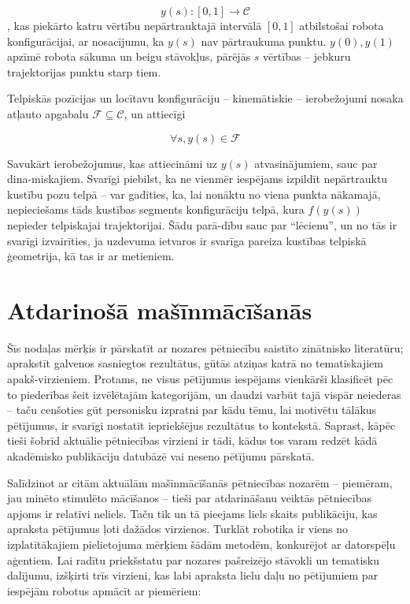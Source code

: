 \documentclass[12pt, a4paper]{article}
\numberwithin{equation}{section} %
\begin{document}
\begin{equation}
    y(s): [0,1] \rightarrow \mathcal{C}
\end{equation}
, kas piekārto katru vērtību nepārtrauktajā intervālā $[0,1]$ atbilstošai robota konfigurācijai, ar nosacījumu, ka $y(s)$ nav pārtraukuma punktu. $y(0), y(1)$ apzīmē robota sākuma un beigu stāvokļus, pārējās $s$ vērtības -- jebkuru trajektorijas punktu starp tiem.

Telpiskās pozīcijas un locītavu konfigurāciju -- kinemātiskie -- ierobežojumi nosaka atļauto apgabalu $\mathcal{F} \subseteq \mathcal{C}$, un attiecīgi

\begin{equation}
    \forall s,y(s) \in \mathcal{F}
\end{equation}

Savukārt ierobežojumus, kas attiecināmi uz $y(s)$ atvasinājumiem, sauc par dina-miskajiem. Svarīgi piebilst, ka ne vienmēr iespējams izpildīt nepārtrauktu kustību pozu telpā -- var gadīties, ka, lai nonāktu no viena punkta nākamajā, nepieciešams tāds kustības segments konfigurāciju telpā, kura $f(y(s))$ nepieder telpiskajai trajektorijai. Šādu parā-dību sauc par ``lēcienu'', un no tās ir svarīgi izvairīties, ja uzdevuma ietvaros ir svarīga pareiza kustības telpiskā ģeometrija, kā tas ir ar metieniem.


%
%
%
%
%
%
%
%
%
%
%
%
%
%
%
%
%
%
%

\newpage
\section{Atdarinošā mašīnmācīšanās}

Šīs nodaļas mērķis ir pārskatīt ar nozares pētniecību saistīto zinātnisko literatūru; aprakstīt galvenos sasniegtos rezultātus, gūtās atziņas katrā no tematiskajiem apakš-virzieniem. Protams, ne visus pētījumus iespējams vienkārši klasificēt pēc to piederības šeit izvēlētajām kategorijām, un daudzi varbūt tajā vispār neiederas -- taču cenšoties gūt personisku izpratni par kādu tēmu, lai motivētu tālākus pētījumus, ir svarīgi nostatīt iepriekšējus rezultātus to kontekstā. Saprast, kāpēc tieši šobrīd aktuālie pētniecības virzieni ir tādi, kādus tos varam redzēt kādā akadēmisko publikāciju datubāzē vai neseno pētījumu pārskatā.

Salīdzinot ar citām aktuālām mašīnmācīšanās pētniecības nozarēm -- piemēram, jau minēto stimulēto mācīšanos -- tieši par atdarināšanu veiktās pētniecības apjoms ir relatīvi neliels. Taču tik un tā pieejams liels skaits publikāciju, kas apraksta pētījumus ļoti dažādos virzienos. Turklāt robotika ir viens no izplatītākajiem pielietojuma mērķiem šādām metodēm, konkurējot ar datorspēļu aģentiem. Lai radītu priekšstatu par nozares pašreizējo stāvokli un tematisku dalījumu, izšķirti trīs virzieni, kas labi apraksta lielu daļu no pētījumiem par iespējām robotus apmācīt ar piemēriem:
\end{document}
